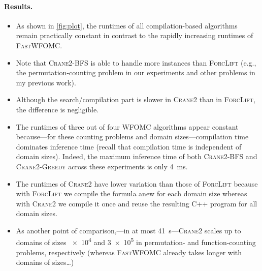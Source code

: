 \documentclass{article}
\theoremstyle{definition}
\newcommand{\Cranetwo}{\textsc{Crane2}}
\newcommand{\Cranebfs}{\textsc{Crane2-BFS}}
\newcommand{\Cranegreedy}{\textsc{Crane2-Greedy}}
\begin{document}
\paragraph{Results.}
\begin{itemize}
  \item As shown in \cref{fig:plot}, the runtimes of all compilation-based
        algorithms remain practically constant in contrast to the rapidly
        increasing runtimes of \textsc{FastWFOMC}.
  \item Note that \Cranebfs{} is able to handle more instances than
        \textsc{ForcLift} (e.g., the permutation-counting problem in our
        experiments and other problems in my previous work).
  \item Although the search/compilation part is slower in \Cranetwo{} than in
        \textsc{ForcLift}, the difference is negligible.
  \item The runtimes of three out of four WFOMC algorithms appear constant
        because---for these counting problems and domain sizes---compilation
        time dominates inference time (recall that compilation time is
        independent of domain sizes). Indeed, the maximum inference time of both
        \Cranebfs{} and \Cranegreedy{} across these experiments is
        only \SI{4}{\milli\second}.
  \item The runtimes of \Cranetwo{} have lower variation than those of
        \textsc{ForcLift} because with \textsc{ForcLift} we compile the formula
        anew for each domain size whereas with \Cranetwo{} we compile it once
        and reuse the resulting C++ program for all domain sizes.
  \item As another point of comparison,---in at most
        \SI{41}{\second}---\Cranetwo{} scales up to domains of sizes \num{e4}
        and \num{3e5} in permutation- and function-counting problems,
        respectively (whereas \textsc{FastWFOMC} already takes longer with
        domains of sizes\dots)
\end{itemize}

\end{document}

